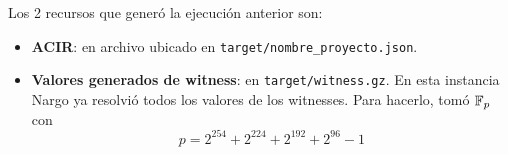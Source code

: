 \documentclass[11pt,a4paper]{tesis}
\begin{document}
\begin{enumerate}[start=3]
\end{enumerate}

\noindent\parbox{\linewidth}{%
	}

Los 2 recursos que generó la ejecución anterior son:
\begin{itemize}
	\item \textbf{ACIR}: en archivo ubicado en \texttt{target/nombre\_proyecto.json}.
	\item \textbf{Valores generados de witness}: en \texttt{target/witness.gz}. En esta instancia Nargo ya resolvió todos los valores de los witnesses. Para hacerlo, tomó $\mathbb{F}_p$ con 
	$$p=2^{254}+2^{224}+2^{192}+2^{96}-1$$
\end{itemize}
\end{document}
